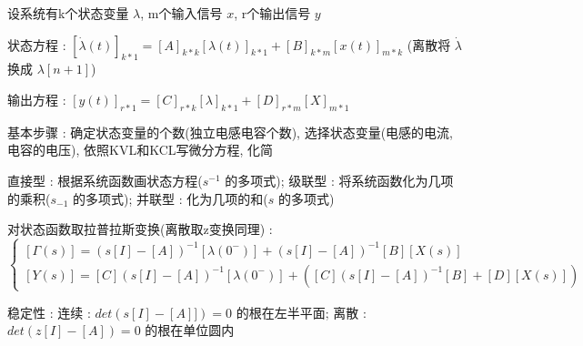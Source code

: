 \documentclass[UTF8, 12pt]{ctexart}
\begin{document}
	设系统有k个状态变量 $ \lambda $, m个输入信号 $ x $, r个输出信号 $ y $

	状态方程 : $ [\dot{\lambda}(t)]_{k*1} = [A]_{k*k}[\lambda(t)]_{k*1} + [B]_{k*m}[x(t)]_{m*k} $ (离散将 $ \dot{\lambda} $ 换成 $ \lambda[n+1] $)

	输出方程 : $ [y(t)]_{r*1} = [C]_{r*k}[\lambda]_{k*1} + [D]_{r*m}[X]_{m*1} $

	基本步骤 : 确定状态变量的个数(独立电感电容个数), 选择状态变量(电感的电流, 电容的电压), 依照KVL和KCL写微分方程, 化简

	直接型 : 根据系统函数画状态方程($ s^{-1} $ 的多项式); 级联型 : 将系统函数化为几项的乘积($ s_{-1} $ 的多项式); 并联型 : 化为几项的和($ s $ 的多项式)

	对状态函数取拉普拉斯变换(离散取z变换同理) : 
		$
		\begin{cases} 
			[\Gamma(s)] = (s[I]-[A])^{-1}[\lambda(0^{-})] + (s[I]-[A])^{-1}[B][X(s)] \\
			[Y(s)] = [C](s[I]-[A])^{-1}[\lambda(0^{-})] + ([C](s[I]-[A])^{-1}[B]+[D][X(s)])
		\end{cases} 
		$
	
	稳定性 : 连续 : $ det(s[I]-[A]]) = 0 $ 的根在左半平面; 离散 : $ det(z[I]-[A]) = 0 $ 的根在单位圆内
\end{document}
